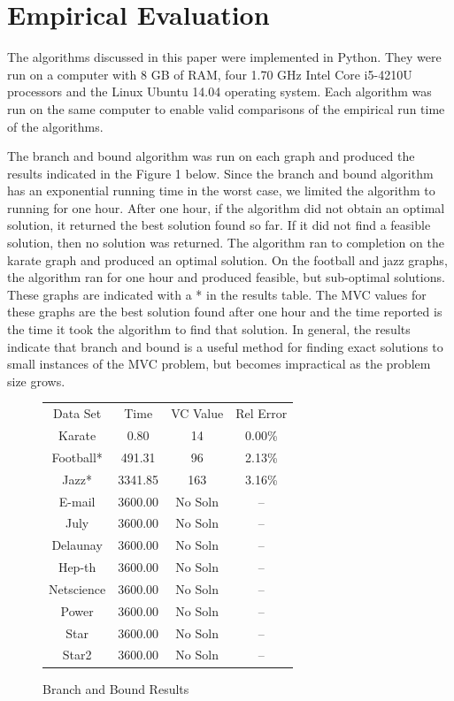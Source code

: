 \documentclass{sig-alternate-05-2015}
\begin{document}
\section{Empirical Evaluation}
The algorithms discussed in this paper were implemented in Python. They were run on a computer with 8 GB of RAM, four 1.70 GHz Intel Core i5-4210U processors and the Linux Ubuntu 14.04 operating system. Each algorithm was run on the same computer to enable valid comparisons of the empirical run time of the algorithms.
\par
The branch and bound algorithm was run on each graph and produced the results indicated in the Figure 1 below. Since the branch and bound algorithm has an exponential running time in the worst case, we limited the algorithm to running for one hour. After one hour, if the algorithm did not obtain an optimal solution, it returned the best solution found so far. If it did not find a feasible solution, then no solution was returned. The algorithm ran to completion on the karate graph and produced an optimal solution. On the football and jazz graphs, the algorithm ran for one hour and produced feasible, but sub-optimal solutions. These graphs are indicated with a * in the results table. The MVC values for these graphs are the best solution found after one hour and the time reported is the time it took the algorithm to find that solution. In general, the results indicate that branch and bound is a useful method for finding exact solutions to small instances of the MVC problem, but becomes impractical as the problem size grows.

\begin{figure}
\centering
\caption{Branch and Bound Results}
\begin{tabular}{c c c c}
Data Set & Time & VC Value & Rel Error \\
Karate & 0.80 & 14 & 0.00\% \\
Football* & 491.31 & 96 & 2.13\% \\
Jazz* & 3341.85 & 163 & 3.16\% \\
E-mail & 3600.00 & No Soln & -- \\
July & 3600.00 & No Soln & -- \\
Delaunay & 3600.00 & No Soln & -- \\
Hep-th & 3600.00 & No Soln & -- \\
Netscience & 3600.00 & No Soln & -- \\
Power & 3600.00 & No Soln & -- \\
Star & 3600.00 & No Soln & -- \\
Star2 & 3600.00 & No Soln & -- \\
\end{tabular}
\end{figure}
\end{document}
